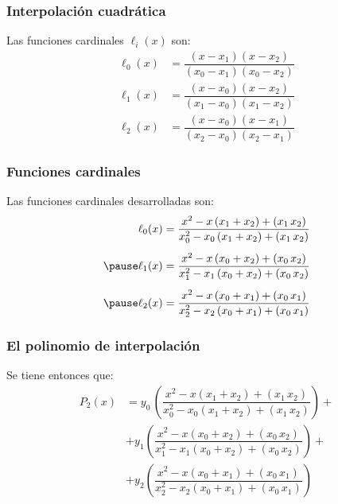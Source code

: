 \documentclass[12pt]{beamer}
\begin{document}
\begin{frame}
\frametitle{Interpolación cuadrática}
Las funciones cardinales $\ell_{i}(x)$ son:
\pause
\begin{align*}
\ell_{0} (x) &= \dfrac{(x - x_{1})(x - x_{2})}{(x_{0} - x_{1})(x_{0} - x_{2})} \\[1em]
\ell_{1} (x) &= \dfrac{(x - x_{0})(x - x_{2})}{(x_{1} - x_{0})(x_{1} - x_{2})} \\[1em]
\ell_{2} (x) &= \dfrac{(x - x_{0})(x - x_{1})}{(x_{2} - x_{0})(x_{2} - x_{1})} 
\end{align*}
\end{frame}
\begin{frame}
\frametitle{Funciones cardinales}
Las funciones cardinales desarrolladas son:
\pause
\begin{eqnarray*}
\begin{aligned}
\ell_{0} (x) = \dfrac{x^{2} - x \left( x_{1} + x_{2} \right) + \left( x_{1} \, x_{2} \right)}{x_{0}^{2} - x_{0} \left( x_{1} + x_{2} \right) + \left( x_{1} \, x_{2} \right)} \\[0.5em] \pause
\ell_{1} (x) = \dfrac{x^{2} - x \left( x_{0} + x_{2} \right) + \left( x_{0} \, x_{2} \right)}{x_{1}^{2} - x_{1} \left( x_{0} + x_{2} \right) + \left( x_{0} \, x_{2} \right)} \\[0.5em] \pause
\ell_{2} (x) = \dfrac{x^{2} - x \left( x_{0} + x_{1} \right) + \left( x_{0} \, x_{1} \right)}{x_{2}^{2} - x_{2} \left( x_{0} + x_{1} \right) + \left( x_{0} \, x_{1} \right)}
\end{aligned}
\end{eqnarray*}
\end{frame}
\begin{frame}
\frametitle{El polinomio de interpolación}
Se tiene entonces que:
\pause
\begin{align*}
P_{2} (x) &= y_{0} \, \left( \dfrac{x^{2} - x \left( x_{1} + x_{2} \right) + \left( x_{1} \, x_{2} \right)}{x_{0}^{2} - x_{0} \left( x_{1} + x_{2} \right) + \left( x_{1} \, x_{2} \right)} \right) +  \\[0.5em]
&+ y_{1} \left( \dfrac{x^{2} - x \left( x_{0} + x_{2} \right) + \left( x_{0} \, x_{2} \right)}{x_{1}^{2} - x_{1} \left( x_{0} + x_{2} \right) + \left( x_{0} \, x_{2} \right)} \right) + \\[0.5em]
&+ y_{2} \left( \dfrac{x^{2} - x \left( x_{0} + x_{1} \right) + \left( x_{0} \, x_{1} \right)}{x_{2}^{2} - x_{2} \left( x_{0} + x_{1} \right) + \left( x_{0} \, x_{1} \right)} \right)
\end{align*}
\end{frame}
\end{document}
